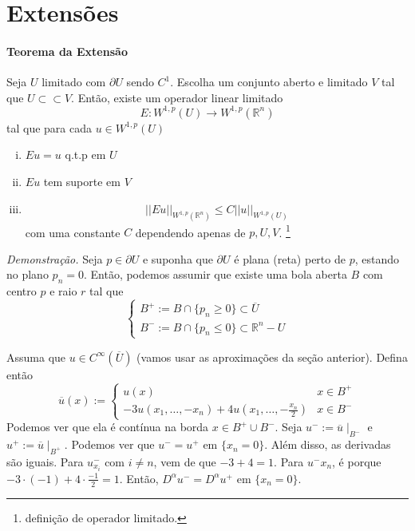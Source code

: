 \documentclass[a4paper, 11pt]{book}
\newcommand{\Rn}{{\mathbb{R}^n}}
\newcommand{\pu}{\partial U}
\begin{document}
\section{Extensões}

\paragraph{Teorema da Extensão}\label{t:sobolev-extensao} Seja \( U \) limitado com \( \pu \) sendo \( C^1 \).  Escolha um conjunto aberto e limitado \( V \) tal que \( U \subset\subset V \). Então, existe um operador linear limitado \[ E:W^{1,p}(U) \rightarrow W^{1,p}(\Rn) \] tal que para cada \( u \in W^{1,p}(U) \) \begin{enumerate}[(i)]
	\item \( Eu=u \) q.t.p em \( U \)
	\item \( Eu \) tem suporte em \( V \)
	\item \[ ||Eu||_{W^{1,p}(\Rn)} \leq C ||u||_{W^{1,p}(U)} \] com uma constante \( C \) dependendo apenas de \( p, U, V \). \footnote{definição de operador limitado.}
\end{enumerate}

\textit{Demonstração.} Seja \( p \in \pu \) e suponha que \( \pu \) é plana (reta) perto de \( p \), estando no plano \( p_n=0 \). Então, podemos assumir que existe uma bola aberta \( B \) com centro \( p \) e raio \( r \) tal que \[ \begin{cases}
	B^+ := B \cap \{ p_n \geq 0 \}  \subset \overline{U}\\
	B^- := B \cap \{ p_n \leq 0 \} \subset \Rn - U 
\end{cases} \]

Assuma que \( u \in C^\infty (\overline{U}) \) (vamos usar as aproximações da seção anterior). Defina então \[ \overline{u}(x) := \begin{cases}
	u(x) & x \in B^+ \\
	-3u(x_1, \ldots, -x_n) + 4u(x_1, \ldots, -\frac{x_n}{2}) & x \in B^-
\end{cases} \] Podemos ver que ela é contínua na borda \( x \in B^+ \cup B^- \). Seja \( u^- := \overline{u}\mid_{B^-} \) e \( u^+ := \overline{u}\mid_{B^+} \).  Podemos ver que \( u^- = u^+ \) em \( \{x_n=0\}\). Além disso, as derivadas são iguais. Para \( u^-_{x_i} \) com \( i \neq n \), vem de que \( -3 + 4 = 1 \). Para \( u^-{x_n} \), é porque \( -3 \cdot (-1) + 4 \cdot \frac{-1}{2} = 1 \). Então, \( D^\alpha u^- = D^\alpha u^+ \) em \( \{x_n=0\} \).
\end{document}
